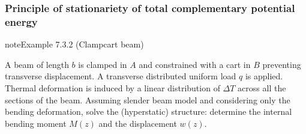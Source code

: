 \documentclass[letterpaper,10pt,english]{jupyterBook}
\begin{document}
\subsubsection{Principle of stationariety of total complementary potential energy}
\label{\detokenize{ch/solids/small-displacements-statics-beams-weak-form:principle-of-stationariety-of-total-complementary-potential-energy}}\label{\detokenize{ch/solids/small-displacements-statics-beams-weak-form:solid-mechanics-intro-small-displacements-statics-beam-weak-form-weak-stationariety-potential-complementary}}\label{ch/solids/small-displacements-statics-beams-weak-form:example-1}
\begin{sphinxadmonition}{note}{Example 7.3.2 (Clamp\sphinxhyphen{}cart beam)}



\sphinxAtStartPar
A beam of length \(b\) is clamped in \(A\) and constrained with a cart in \(B\) preventing transverse displacement. A transverse distributed uniform load \(q\) is applied. Thermal deformation is induced by a linear distribution of \(\Delta T\) across all the sections of the beam. Assuming slender beam model and considering only the bending deformation, solve the (hyperstatic) structure: determine the internal bending moment \(M(z)\) and the displacement \(w(z)\).


\end{sphinxadmonition}
\end{document}
